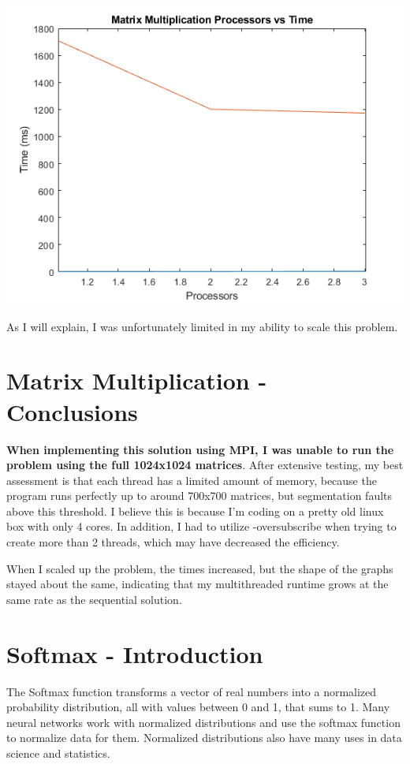 \documentclass[a4paper]{article}
\begin{document}
\begin{center}
    \includegraphics[scale=1]{1a.png}
\end{center}

\noindent
As I will explain, I was unfortunately limited in my ability to scale this problem.


\section{Matrix Multiplication - Conclusions}

\textbf{When implementing this solution using MPI, I was unable to run the problem using the full 1024x1024 matrices}. After extensive testing, my best assessment is that each thread has a limited amount of memory, because the program runs perfectly up to around 700x700 matrices, but segmentation faults above this threshold. I believe this is because I'm coding on a pretty old linux box with only 4 cores. In addition, I had to utilize -oversubscribe when trying to create more than 2 threads, which may have decreased the efficiency.


When I scaled up the problem, the times increased, but the shape of the graphs stayed about the same, indicating that my multithreaded runtime grows at the same rate as the sequential solution.

\section{Softmax - Introduction}

The Softmax function transforms a vector of real numbers into a normalized probability distribution, all with values between 0 and 1, that sums to 1. Many neural networks work with normalized distributions and use the softmax function to normalize data for them. Normalized distributions also have many uses in data science and statistics.
\end{document}
